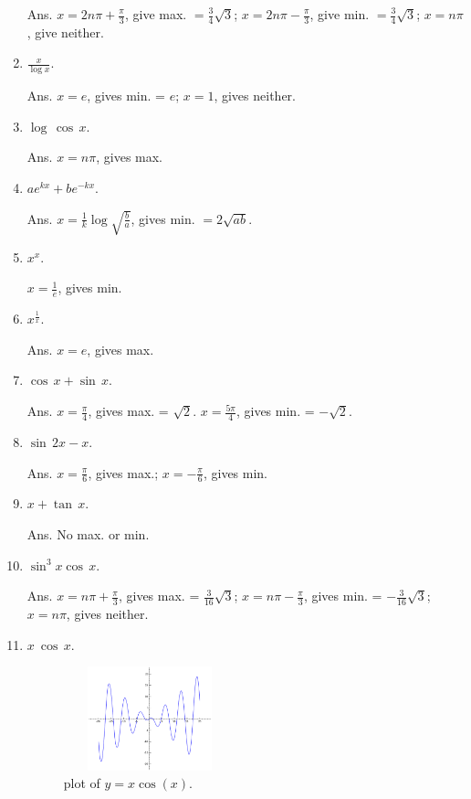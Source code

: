 \begin{enumerate}
Ans. 	$x = 2n\pi + \frac{\pi}{3}$, give max. $= \frac{3}{4}\sqrt{3}$;
  	$x = 2n\pi - \frac{\pi}{3}$, give min. $= \frac{3}{4}\sqrt{3}$;
  	$x = n\pi$, give neither.

\item
$\frac{x}{\log x}$.

Ans. $	x = e$, gives min. = $e$;
$x = 1$, gives neither.

\item
$\log\, \cos\, x$.

Ans. $	x = n\pi$, gives max.

\item
$ae^{kx} + be^{- kx}$.

Ans. $ 	x = \frac{1}{k} \log \sqrt{\frac{b}{a}}$, gives min. $= 2\sqrt{ab}$.

\item
$x^x$. 	  
	
$x = \frac{1}{e}$, gives min.

\item
$x^{\frac{1}{x}}$.

Ans. $x = e$, gives max.

\item
$\cos\, x + \sin\, x$. 

Ans. $x = \frac{\pi}{4}$, gives max. = $\sqrt{2}$.
$x = \frac{5\pi}{4}$, gives min. = $-\sqrt{2}$.

\item
$\sin\, 2x - x$.

Ans. $ 	x = \frac{\pi}{6}$, gives max.;
$x = -\frac{\pi}{6}$, gives min.

\item
$x + \tan\, x$.

Ans. 	No max. or min.

\item
$\sin^3x\cos\, x$. 

Ans. $x = n \pi + \frac{\pi}{3}$, gives max. = $\frac{3}{16} \sqrt{3}$;
$x = n \pi - \frac{\pi}{3}$, gives min. = $-\frac{3}{16} \sqrt{3}$;
$x = n\pi$, gives neither.

\item
$x \ \cos\, x$. 	

\begin{figure}[h!]
\begin{minipage}{\textwidth}
\begin{center}
\includegraphics[height=3cm,width=5cm]{ch8-prblm111.eps}
\end{center}
\end{minipage}
\caption{\sage plot of $y=x\cos(x)$.}
\label{fig:ch8-prblm11}
\end{figure}


\end{enumerate}
